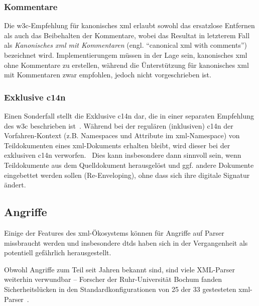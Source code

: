 \subsubsection{Kommentare}
\label{sec:c14ncomments}

Die \gls{w3c}-Empfehlung für kanonisches \acrshort{xml} erlaubt sowohl das ersatzlose Entfernen als auch das Beibehalten der Kommentare, wobei das Resultat in letzterem Fall als \emph{Kanonisches \acrshort{xml} mit Kommentaren} (engl. \enquote{canonical \acrshort{xml} with comments})~\cite[Abschnitt 2.1]{boyer2001c14n} bezeichnet wird. Implementierungem müssen in der Lage sein, kanonisches \acrshort{xml} ohne Kommentare zu erstellen, während die Ünterstützung für kanonisches \acrshort{xml} mit Kommentaren zwar empfohlen, jedoch nicht vorgeschrieben ist.

\subsubsection{Exklusive \acrlong{c14n}}
\label{sec:excc14n}

Einen Sonderfall stellt die Exklusive \acrlong{c14n} dar, die in einer separaten Empfehlung des \gls{w3c} beschrieben ist~\cite{boyer2002excc14n}. Während bei der regulären (inklusiven) \acrlong{c14n} der Vorfahren-Kontext (z.B. Namespaces und Attribute im \acrshort{xml}-Namespace) von Teildokumenten eines \acrshort{xml}-Dokuments erhalten bleibt, wird dieser bei der exklusiven \acrshort{c14n} verworfen.~\cite[Abschnitt~18]{siddiqui2002c14n2} Dies kann insbesondere dann sinnvoll sein, wenn Teildokumente aus dem Quelldokument herausgelöst und ggf. andere Dokumente eingebettet werden sollen (Re-Enveloping), ohne dass sich ihre digitale Signatur ändert.

\subsection{Angriffe}
\label{sec:xmlattacks}

Einige der Features des \acrshort{xml}-Ökosystems können für Angriffe auf Parser missbraucht werden und insbesondere \glspl{dtd} haben sich in der Vergangenheit als potentiell gefährlich herausgestellt.~\cite[S.~4]{morgan2014xml}

Obwohl Angriffe zum Teil seit Jahren bekannt sind, sind viele XML-Parser weiterhin verwundbar -- Forscher der Ruhr-Universität Bochum fanden Sicherheitslücken in den Standardkonfigurationen von 25 der 33 gestesteten \acrshort{xml}-Parser~\cite{spaeth2016sok}.

